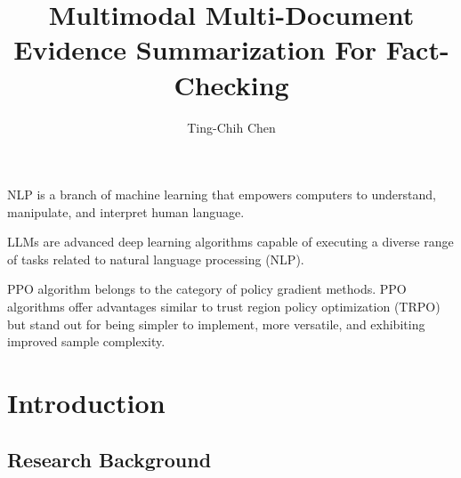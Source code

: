\documentclass[doublespace,nopageskip]{VTthesis}
\title{Multimodal Multi-Document Evidence Summarization For Fact-Checking
}
\author{Ting-Chih Chen}
\begin{document}
  \frontmatter
  \maketitle
  \tableofcontents

	\listoffigures

	\listoftables
 
    \printnomenclature %


NLP is a branch of machine learning that empowers computers to understand, manipulate, and interpret human language.
 

LLMs are advanced deep learning algorithms capable of executing a diverse range of tasks related to natural language processing (NLP).


PPO algorithm belongs to the category of policy gradient methods. PPO algorithms offer advantages similar to trust region policy optimization (TRPO) but stand out for being simpler to implement, more versatile, and exhibiting improved sample complexity.


	\mainmatter

 
	\chapter{Introduction} \label{ch:introduction}   
    \section{Research Background} \label{se:res_back}
        
\end{document}

